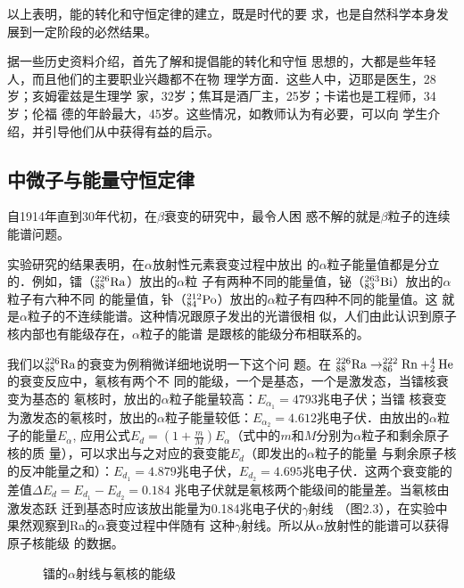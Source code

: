 以上表明，能的转化和守恒定律的建立，既是时代的要
求，也是自然科学本身发展到一定阶段的必然结果。

据一些历史资料介绍，首先了解和提倡能的转化和守恒
思想的，大都是些年轻人，而且他们的主要职业兴趣都不在物
理学方面．这些人中，迈耶是医生，28岁；亥姆霍兹是生理学
家，32岁；焦耳是酒厂主，25岁；卡诺也是工程师，34岁；伦福
德的年龄最大，45岁。这些情况，如教师认为有必要，可以向
学生介绍，并引导他们从中获得有益的启示。

\subsection{中微子与能量守恒定律}
自1914年直到30年代初，在$\beta$衰变的研究中，最令人困
惑不解的就是$\beta$粒子的连续能谱问题。

实验研究的结果表明，在$\alpha$放射性元素衰变过程中放出
的$\alpha$粒子能量值都是分立的．例如，镭（$^{226}_{88}{\rm Ra}$）放出的$\alpha$粒
子有两种不同的能量值，铋（$^{263}_{83}{\rm Bi}$）放出的$\alpha$粒子有六种不同
的能量值，钋（$^{212}_{84}{\rm Po}$）放出的$\alpha$粒子有四种不同的能量值。这
就是$\alpha$粒子的不连续能谱。这种情况跟原子发出的光谱很相
似，人们由此认识到原子核内部也有能级存在，$\alpha$粒子的能谱
是跟核的能级分布相联系的。

我们以$^{226}_{88}{\rm Ra}$的衰变为例稍微详细地说明一下这个问
题。在
$^{226}_{88}{\rm Ra}\to ^{222}_{86}{\rm Rn}+^{4}_{2}{\rm He}$的衰变反应中，氡核有两个不
同的能级，一个是基态，一个是激发态，当镭核衰变为基态的
氡核时，放出的$\alpha$粒子能量较高：$E_{\alpha_1}=4793$兆电子伏；当镭
核衰变为激发态的氡核时，放出的$\alpha$粒子能量较低：$E_{\alpha_2}=
4.612$兆电子伏．由放出的$\alpha$粒子的能量$E_{\alpha}$, 应用公式$E_d=\left(1+\frac{m}{M}\right)E_{\alpha}$（式中的$m$和$M$分别为$\alpha$粒子和剩余原子核的质
量），可以求出与之对应的衰变能$E_d$（即发出的$\alpha$粒子的能量
与剩余原子核的反冲能量之和）：$E_{d_1}=4.879$兆电子伏，$E_{d_2}=
4.695$兆电子伏．这两个衰变能的差值$\Delta E_{d}=E_{d_1}-E_{d_2}=0.184$
兆电子伏就是氡核两个能级间的能量差。当氡核由激发态跃
迁到基态时应该放出能量为0.184兆电子伏的$\gamma$射线
（图2.3），在实验中果然观察到Ra的$\alpha$衰变过程中伴随有
这种$\gamma$射线。所以从$\alpha$放射性的能谱可以获得原子核能级
的数据。
\begin{figure}[htp]
    \centering
{}
    \caption{镭的$\alpha$射线与氡核的能级}
\end{figure}


